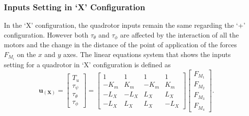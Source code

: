 \subsubsection{Inputs Setting in `X' Configuration}
In the `X' configuration, the quadrotor inputs remain the same regarding the `+' configuration. However both $\tau_\theta$ and $\tau_\phi$ are affected by the interaction of all the motors and the change in the distance of the point of application of the forces $F_{M_i}$ on the $x$ and $y$ axes. The linear equations system that shows the inputs setting for a quadrotor in `X' configuration is defined as
\begin{equation}
	\mathbf{u_{(X)}} = \begin{bmatrix}
	T_u\\[5pt]
	\tau_{\psi}\\[5pt]
	\tau_{\theta}\\[5pt]
	\tau_{\phi}
	\end{bmatrix} = \begin{bmatrix}
	1 & 1 & 1 & 1 \\[5pt]
	-K_{m} & K_{m} & -K_{m} & K_{m}\\[5pt]
	-L_{X} & -L_{X} & L_{X} & L_{X}\\[5pt]
	-L_{X} & L_{X} & L_{X} & -L_{X}
							\end{bmatrix}
\begin{bmatrix}
F_{M_1}\\[5pt]
F_{M_2}\\[5pt]
F_{M_3}\\[5pt]
F_{M_4}
\end{bmatrix}.
	\label{ec:U_X}						
\end{equation}

